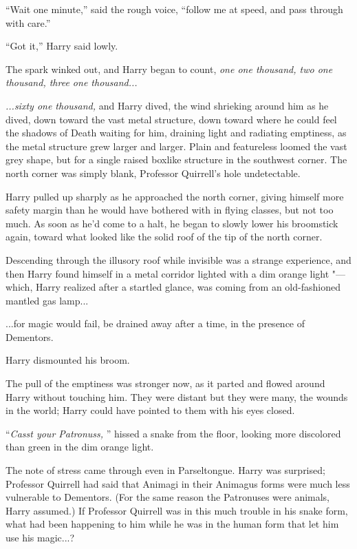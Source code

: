 ``Wait one minute,'' said the rough voice, ``follow me at speed, and
pass through with care.''

``Got it,'' Harry said lowly.

The spark winked out, and Harry began to count, \emph{one one thousand,
two one thousand, three one thousand...}

\emph{...sixty one thousand,} and Harry dived, the wind shrieking
around him as he dived, down toward the vast metal structure, down
toward where he could feel the shadows of Death waiting for him,
draining light and radiating emptiness, as the metal structure grew
larger and larger. Plain and featureless loomed the vast grey shape, but
for a single raised boxlike structure in the southwest corner. The north
corner was simply blank, Professor Quirrell's hole undetectable.

Harry pulled up sharply as he approached the north corner, giving
himself more safety margin than he would have bothered with in flying
classes, but not too much. As soon as he'd come to a halt, he began to
slowly lower his broomstick again, toward what looked like the solid
roof of the tip of the north corner.

Descending through the illusory roof while invisible was a strange
experience, and then Harry found himself in a metal corridor lighted
with a dim orange light "--- which, Harry realized after a startled glance,
was coming from an old-fashioned mantled gas lamp...

...for magic would fail, be drained away after a time, in the
presence of Dementors.

Harry dismounted his broom.

The pull of the emptiness was stronger now, as it parted and flowed
around Harry without touching him. They were distant but they were many,
the wounds in the world; Harry could have pointed to them with his eyes
closed.

``\emph{Casst your Patronuss,} '' hissed a snake from the floor, looking
more discolored than green in the dim orange light.

The note of stress came through even in Parseltongue. Harry was
surprised; Professor Quirrell had said that Animagi in their Animagus
forms were much less vulnerable to Dementors. (For the same reason the
Patronuses were animals, Harry assumed.) If Professor Quirrell was in
this much trouble in his snake form, what had been happening to him
while he was in the human form that let him use his magic...?

